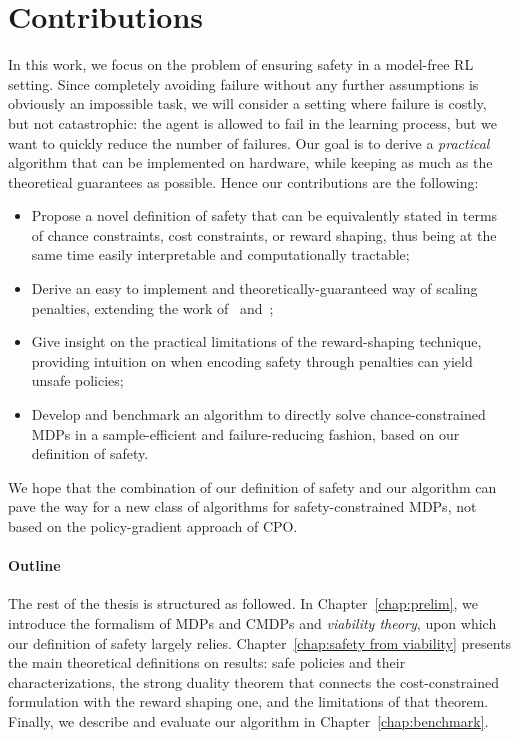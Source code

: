 \section{Contributions}
	In this work, we focus on the problem of ensuring safety in a model-free RL setting. Since completely avoiding failure without any further assumptions is obviously an impossible task, we will consider a setting where failure is costly, but not catastrophic: the agent is allowed to fail in the learning process, but we want to quickly reduce the number of failures. Our goal is to derive a\emph{ practical} algorithm that can be implemented on hardware, while keeping as much as the theoretical guarantees as possible. Hence our contributions are the following:
	\begin{itemize}
		\item Propose a novel definition of safety that can be equivalently stated in terms of chance constraints, cost constraints, or reward shaping, thus being at the same time easily interpretable and computationally tractable;
		\item Derive an easy to implement and theoretically-guaranteed way of scaling penalties, extending the work of~\cite{altman1999constrained} and~\cite{paternain2019safe};
		\item Give insight on the practical limitations of the reward-shaping technique, providing intuition on when encoding safety through penalties can yield unsafe policies;
		\item Develop and benchmark an algorithm to directly solve chance-constrained MDPs in a sample-efficient and failure-reducing fashion, based on our definition of safety.
	\end{itemize}
	We hope that the combination of our definition of safety and our algorithm can pave the way for a new class of algorithms for safety-constrained MDPs, not based on the policy-gradient approach of CPO.
	\paragraph{Outline} The rest of the thesis is structured as followed. In Chapter~\ref{chap:prelim}, we introduce the formalism of MDPs and CMDPs and\emph{ viability theory}, upon which our definition of safety largely relies. Chapter~\ref{chap:safety from viability} presents the main theoretical definitions on results: safe policies and their characterizations, the strong duality theorem that connects the cost-constrained formulation with the reward shaping one, and the limitations of that theorem. Finally, we describe and evaluate our algorithm in Chapter~\ref{chap:benchmark}.